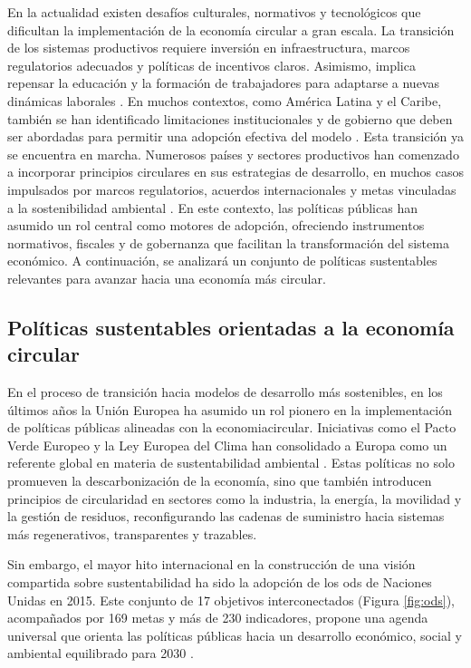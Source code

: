 En la actualidad existen desafíos culturales, normativos y tecnológicos que dificultan la implementación de la economía circular a gran escala. La transición de los sistemas productivos requiere inversión en infraestructura, marcos regulatorios adecuados y políticas de incentivos claros. Asimismo, implica repensar la educación y la formación de trabajadores para adaptarse a nuevas dinámicas laborales \cite{da2022economia}. En muchos contextos, como América Latina y el Caribe, también se han identificado limitaciones institucionales y de gobierno que deben ser abordadas para permitir una adopción efectiva del modelo \cite{cepal2021economia}. Esta transición ya se encuentra en marcha. Numerosos países y sectores productivos han comenzado a incorporar principios circulares en sus estrategias de desarrollo, en muchos casos impulsados por marcos regulatorios, acuerdos internacionales y metas vinculadas a la sostenibilidad ambiental \cite{da2022economia, cepal2021economia}. En este contexto, las políticas públicas han asumido un rol central como motores de adopción, ofreciendo instrumentos normativos, fiscales y de gobernanza que facilitan la transformación del sistema económico. A continuación, se analizará un conjunto de políticas sustentables relevantes para avanzar hacia una economía más circular.


\subsection{Políticas sustentables orientadas a la economía circular}

En el proceso de transición hacia modelos de desarrollo más sostenibles, en los últimos años la Unión Europea ha asumido un rol pionero en la implementación de políticas públicas alineadas con la \gls{economiacircular}. Iniciativas como el Pacto Verde Europeo y la Ley Europea del Clima han consolidado a Europa como un referente global en materia de sustentabilidad ambiental \cite{dormido2022cambio}. Estas políticas no solo promueven la descarbonización de la economía, sino que también introducen principios de circularidad en sectores como la industria, la energía, la movilidad y la gestión de residuos, reconfigurando las cadenas de suministro hacia sistemas más regenerativos, transparentes y trazables.

Sin embargo, el mayor hito internacional en la construcción de una visión compartida sobre sustentabilidad ha sido la adopción de los \acrfull{ods} de Naciones Unidas en 2015. Este conjunto de 17 objetivos interconectados (Figura \ref{fig:ods}), acompañados por 169 metas y más de 230 indicadores, propone una agenda universal que orienta las políticas públicas hacia un desarrollo económico, social y ambiental equilibrado para 2030 \cite{gil2018objetivos}.


